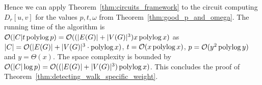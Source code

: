 \noindent
Hence we can apply Theorem~\ref{thm:circuits_framework} to the circuit computing $D_r[u,v]$ for the values $p,t,\omega$ from Theorem~\ref{thm:good_p_and_omega}. 
The running time of the algorithm is $\mathcal{O}(|C|t\operatorname{polylog} p)=\mathcal{O}((|E(G)|+|V(G)|^3) x \operatorname{polylog} x)$ as $|C|=\mathcal{O}(|E(G)|+|V(G)|^3\cdot \operatorname{polylog} x)$, $t=\mathcal{O}(x\operatorname{polylog} x)$, $p=\mathcal{O}(y^2\operatorname{polylog} y)$ and $y=\Theta(x)$.
The space complexity is bounded by~$\mathcal{O}(|C|\log p)=\mathcal{O}((|E(G)|+|V(G)|^3) \operatorname{polylog} x)$.
This concludes the proof of Theorem~\ref{thm:detecting_walk_specific_weight}.

